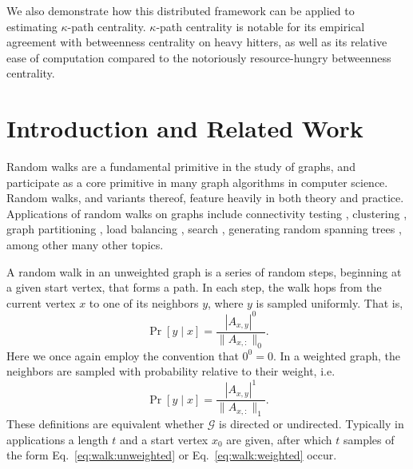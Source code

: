 \documentclass{report}
\begin{document}
We also demonstrate how this distributed framework can be applied to estimating $\kappa$-path centrality.
$\kappa$-path centrality is notable for its empirical agreement with betweenness centrality on heavy hitters, as well as its relative ease of computation compared to the notoriously resource-hungry betweenness centrality. 



\section{Introduction and Related Work}
 \label{walks:sec:intro}

Random walks are a fundamental primitive in the study of graphs, and participate as a core primitive in many graph algorithms in computer science.
Random walks, and variants thereof, feature heavily in both theory and practice. 
Applications of random walks on graphs include connectivity testing \cite{reingold2008undirected}, clustering \cite{andersen2009finding}, graph partitioning \cite{charikar2003better, andersen2007using, spielman2013local}, load balancing \cite{karger2004simple}, search \cite{adamic2001search, lv2002search}, generating random spanning trees \cite{broder1989generating}, among other many other topics. 

A random walk in an unweighted graph is a series of random steps, beginning at a given start vertex, that forms a path.
In each step, the walk hops from the current vertex $x$ to one of its neighbors $y$, where $y$ is sampled uniformly.
That is,  
%
\begin{equation} \label{eq:walk:unweighted}
	\Pr [ y \mid x] = \frac{|A_{x,y}|^0}{\|A_{x,:}\|_0}.
\end{equation}
%
Here we once again employ the convention that $0^0 = 0$.
In a weighted graph, the neighbors are sampled with probability relative to their weight, i.e. 
%
\begin{equation} \label{eq:walk:weighted}
	\Pr [ y \mid x] =  \frac{|A_{x,y}|^1}{\|A_{x,:}\|_1}.
\end{equation}
%
These definitions are equivalent whether $\mathcal{G}$ is directed or undirected.
Typically in applications a length $t$ and a start vertex $x_0$ are given, after which $t$ samples of the form Eq.~\eqref{eq:walk:unweighted} or Eq.~\ref{eq:walk:weighted} occur.
\end{document}
